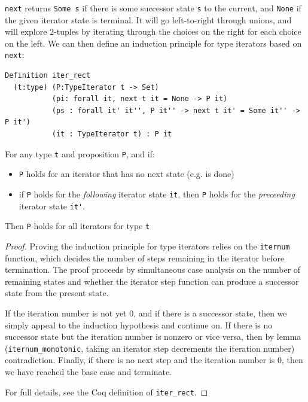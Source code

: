 \documentclass[a4paper,english]{lipics-v2019}
\begin{document}
\verb|next| returns \verb|Some s| if there is some successor state
\verb|s| to the current, and \verb|None| if the given iterator state is
terminal. It will go left-to-right through unions, and will explore 2-tuples
by iterating through the choices on the right for each choice on the left. We can
then define an induction principle for type iterators based on \verb|next|:

\begin{theorem}
\begin{small}\begin{verbatim}
Definition iter_rect
  (t:type) (P:TypeIterator t -> Set)
           (pi: forall it, next t it = None -> P it)
           (ps : forall it' it'', P it'' -> next t it' = Some it'' -> P it')
           (it : TypeIterator t) : P it  
\end{verbatim}\end{small}

For any type \verb|t| and proposition \verb|P|, and if:
\begin{itemize} 
	\item \verb|P| holds for an iterator that has no next state (e.g. is done)
	\item if \verb|P| holds for the \emph{following} iterator state \verb|it|,
	then \verb|P| holds for the \emph{preceeding} iterator state \verb|it'|.
\end{itemize}
Then \verb|P| holds for all iterators for type \verb|t|
\end{theorem}
\begin{proof}
Proving the induction principle for type iterators relies on the \verb|iternum|
function, which decides the number of steps remaining in the iterator before termination.
The proof proceeds by simultaneous case analysis on the number of remaining states and
whether the iterator step function can produce a successor state from the present state.

If the iteration number is not yet 0, and if there is a successor state, then
we simply  appeal to the induction hypothesis and continue on. If there is no
successor state but  the iteration number is nonzero or vice versa, then by
lemma (\verb|iternum_monotonic|, taking an iterator step decrements the
iteration number) contradiction. Finally, if there is no next step and the iteration
number is 0, then we have reached the base case and terminate.

For full details, see the Coq definition of \verb|iter_rect|.
\end{proof}
\end{document}
